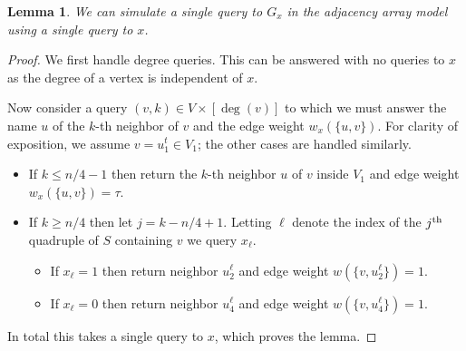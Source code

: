 \documentclass[10pt,a4paper]{article}
\newcommand{\jth}{j^{\scriptsize \mbox{{\rm th}}}}
\newcommand{\1}{\mathbf{1}}
\newtheorem{lemma}[theorem]{Lemma}
\theoremstyle{definition}
\begin{document}
\begin{lemma} \label{lem:adj-query}
We can simulate a single query to $G_x$ in the adjacency array model using a single query to $x$.
\end{lemma}
\begin{proof}
We first handle degree queries.  This can be answered with no queries to $x$ as the degree of a vertex is independent of $x$.

Now consider a query $(v,k) \in V \times [\deg(v)]$ to which we must answer the name $u$ of the $k$-th neighbor of 
$v$ and the edge weight $w_x(\{u,v\})$.  For clarity of exposition, we assume $v = u_1^t \in V_1$; the other cases are handled similarly.
\begin{itemize}
\item
If $k \leq n/4 - 1$ then return the $k$-th neighbor $u$ of $v$ inside $V_1$ and edge weight $w_x(\{u,v\}) = \tau$.
\item
If $k \ge n/4$ then let $j = k -n/4 +1$.  Letting $\ell$ denote the index of the $\jth$ quadruple of $S$ containing $v$ we query $x_\ell$.
\begin{itemize}
\item
If $x_\ell = 1$ then return neighbor $u^\ell_2$ and edge weight $w(\{v,u^\ell_2\}) = 1$.
\item
If $x_\ell = 0$ then return neighbor $u^\ell_4$ and edge weight $w(\{v,u^\ell_4\}) = 1$.
\end{itemize}
\end{itemize}
In total this takes a single query to $x$, which proves the lemma.
\end{proof}
\end{document}
